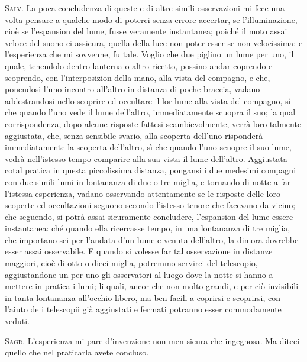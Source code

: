 \documentclass[11pt,twoside,openany]{book}
\newcommand{\speaker}[1]{\textcolor{rubric}{\textsc{#1}}\space}
\begin{document}
\speaker{Salv.} La poca concludenza di queste e di altre simili osservazioni mi fece una volta pensare a qualche modo di poterci senza errore accertar, se l'illuminazione, cioè se l'espansion del lume, fusse veramente instantanea; poiché il moto assai veloce del suono ci assicura, quella della luce non poter esser se non velocissima: e l'esperienza che mi sovvenne, fu tale. Voglio che due piglino un lume per uno, il quale, tenendolo dentro lanterna o altro ricetto, possino andar coprendo e scoprendo, con l'interposizion della mano, alla vista del compagno, e che, ponendosi l'uno incontro all'altro in distanza di poche braccia, vadano addestrandosi nello scoprire ed occultare il lor lume alla vista del compagno, sì che quando l'uno vede il lume dell'altro, immediatamente scuopra il suo; la qual corrispondenza, dopo alcune risposte fattesi scambievolmente, verrà loro talmente aggiustata, che, senza sensibile svario, alla scoperta dell'uno risponderà immediatamente la scoperta dell'altro, sì che quando l'uno scuopre il suo lume, vedrà nell'istesso tempo comparire alla sua vista il lume dell'altro. Aggiustata cotal pratica in questa piccolissima distanza, pongansi i due medesimi compagni con due simili lumi in lontananza di due o tre miglia, e tornando di notte a far l'istessa esperienza, vadano osservando attentamente se le risposte delle loro scoperte ed occultazioni seguono secondo l'istesso tenore che facevano da vicino; che seguendo, si potrà assai sicuramente concludere, l'espansion del lume essere instantanea: ché quando ella ricercasse tempo, in una lontananza di tre miglia, che importano sei per l'andata d'un lume e venuta dell'altro, la dimora dovrebbe esser assai osservabile. E quando si volesse far tal osservazione in distanze maggiori, cioè di otto o dieci miglia, potremmo servirci del telescopio, aggiustandone un per uno gli osservatori al luogo dove la notte si hanno a mettere in pratica i lumi; li quali, ancor che non molto grandi, e per ciò invisibili in tanta lontananza all'occhio libero, ma ben facili a coprirsi e scoprirsi, con l'aiuto de i telescopii già aggiustati e fermati potranno esser commodamente veduti.

\speaker{Sagr.} L'esperienza mi pare d'invenzione non men sicura che ingegnosa. Ma diteci quello che nel praticarla avete concluso.
\end{document}
